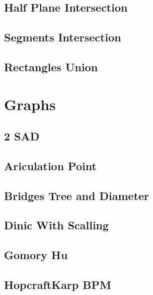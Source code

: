\subsection{Half Plane Intersection}
\raggedbottom
\hrulefill
\subsection{Segments Intersection}
\raggedbottom
\hrulefill
\subsection{Rectangles Union}
\raggedbottom
\hrulefill

\section{Graphs}
\subsection{2 SAD}
\raggedbottom
\hrulefill
\subsection{Ariculation Point}
\raggedbottom
\hrulefill
\subsection{Bridges Tree and Diameter}
\raggedbottom
\hrulefill
\subsection{Dinic With Scalling}
\raggedbottom
\hrulefill
\subsection{Gomory Hu}
\raggedbottom
\hrulefill
\subsection{HopcraftKarp BPM}
\raggedbottom
\hrulefill
